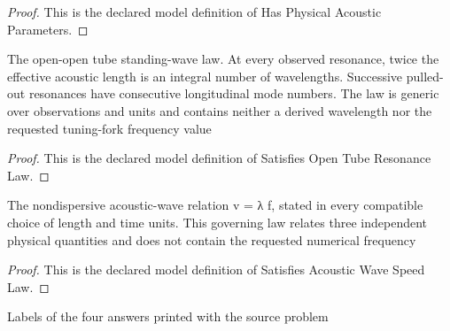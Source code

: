 \begin{proof}
  This is the declared model definition of Has Physical Acoustic Parameters.
\end{proof}
\begin{definition}
  \label{def:physics:phyx-mini-0184:phyxminiproblems-problemphyxmini0184-satisfiesopentuberesonancelaw}
  The open-open tube standing-wave law. At every observed resonance, twice the effective acoustic length is an integral number of wavelengths. Successive pulled-out resonances have consecutive longitudinal mode numbers. The law is generic over observations and units and contains neither a derived wavelength nor the requested tuning-fork frequency value
\end{definition}
\begin{proof}
  This is the declared model definition of Satisfies Open Tube Resonance Law.
\end{proof}
\begin{definition}
  \label{def:physics:phyx-mini-0184:phyxminiproblems-problemphyxmini0184-satisfiesacousticwavespeedlaw}
  The nondispersive acoustic-wave relation v = λ f, stated in every compatible choice of length and time units. This governing law relates three independent physical quantities and does not contain the requested numerical frequency
\end{definition}
\begin{proof}
  This is the declared model definition of Satisfies Acoustic Wave Speed Law.
\end{proof}
\begin{definition}
  \label{def:physics:phyx-mini-0184:phyxminiproblems-problemphyxmini0184-answerchoice}
  Labels of the four answers printed with the source problem
\end{definition}

